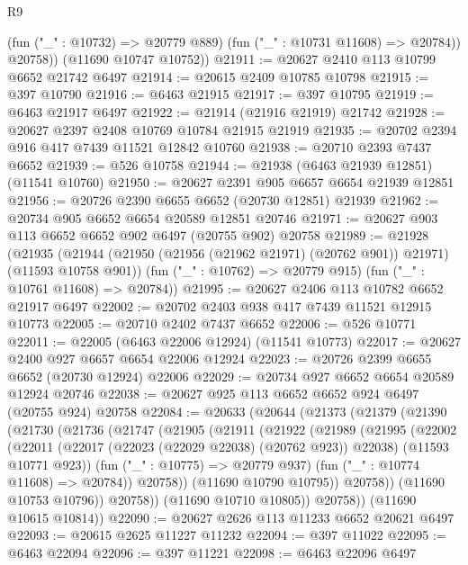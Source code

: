 \begin{lexlean}{R9}
\begin{coremodule}
            (fun ("_" : @10732) => @20779 @889)
            (fun ("_" : @10731 @11608) => @20784))
          @20758))
      (@11690 @10747 @10752))
@21911 := @20627 @2410 @113 @10799 @6652 @21742 @6497
@21914 := @20615 @2409 @10785 @10798
@21915 := @397 @10790
@21916 := @6463 @21915
@21917 := @397 @10795
@21919 := @6463 @21917 @6497
@21922 := @21914 (@21916 @21919) @21742
@21928 := @20627 @2397 @2408 @10769 @10784 @21915 @21919
@21935 := @20702 @2394 @916 @417 @7439 @11521 @12842 @10760
@21938 := @20710 @2393 @7437 @6652
@21939 := @526 @10758
@21944 := @21938 (@6463 @21939 @12851) (@11541 @10760)
@21950 := @20627 @2391 @905 @6657 @6654 @21939 @12851
@21956 := @20726 @2390 @6655 @6652 (@20730 @12851) @21939
@21962 := @20734 @905 @6652 @6654 @20589 @12851 @20746
@21971 := @20627 @903 @113 @6652 @6652 @902 @6497 (@20755 @902) @20758
@21989 := @21928
    (@21935
      (@21944 (@21950 (@21956 (@21962 @21971) (@20762 @901)) @21971) (@11593 @10758 @901))
      (fun ("_" : @10762) => @20779 @915)
      (fun ("_" : @10761 @11608) => @20784))
@21995 := @20627 @2406 @113 @10782 @6652 @21917 @6497
@22002 := @20702 @2403 @938 @417 @7439 @11521 @12915 @10773
@22005 := @20710 @2402 @7437 @6652
@22006 := @526 @10771
@22011 := @22005 (@6463 @22006 @12924) (@11541 @10773)
@22017 := @20627 @2400 @927 @6657 @6654 @22006 @12924
@22023 := @20726 @2399 @6655 @6652 (@20730 @12924) @22006
@22029 := @20734 @927 @6652 @6654 @20589 @12924 @20746
@22038 := @20627 @925 @113 @6652 @6652 @924 @6497 (@20755 @924) @20758
@22084 := @20633
    (@20644
      (@21373
        (@21379
          (@21390
            (@21730
              (@21736
                (@21747
                  (@21905
                    (@21911
                      (@21922
                        (@21989
                          (@21995
                            (@22002
                              (@22011
                                (@22017 (@22023 (@22029 @22038) (@20762 @923)) @22038)
                                (@11593 @10771 @923))
                              (fun ("_" : @10775) => @20779 @937)
                              (fun ("_" : @10774 @11608) => @20784))
                            @20758))
                        (@11690 @10790 @10795))
                      @20758))
                  (@11690 @10753 @10796))
                @20758))
            (@11690 @10710 @10805))
          @20758))
      (@11690 @10615 @10814))
@22090 := @20627 @2626 @113 @11233 @6652 @20621 @6497
@22093 := @20615 @2625 @11227 @11232
@22094 := @397 @11022
@22095 := @6463 @22094
@22096 := @397 @11221
@22098 := @6463 @22096 @6497

\end{coremodule}
\end{lexlean}
